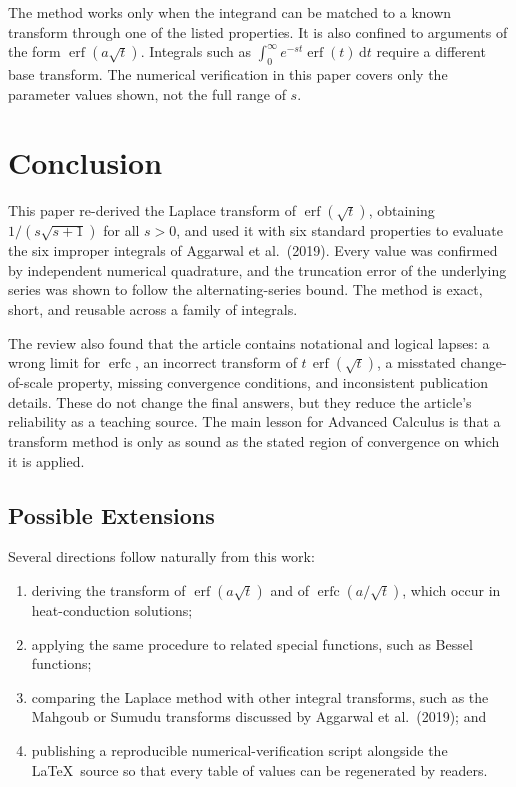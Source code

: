 \documentclass[12pt,a4paper]{article}
\theoremstyle{definition}
\theoremstyle{plain}
\theoremstyle{remark}
\newcommand{\erf}{\operatorname{erf}}
\newcommand{\erfc}{\operatorname{erfc}}
\newcommand{\dd}{\,\mathrm{d}}
\begin{document}
	The method works only when the integrand can be matched to a known transform through one of the listed properties. It is also confined to arguments of the form $\erf(a\sqrt{t})$. Integrals such as $\int_0^\infty e^{-st}\erf(t)\dd t$ require a different base transform. The numerical verification in this paper covers only the parameter values shown, not the full range of $s$.
	
	\section{Conclusion}
	
	This paper re-derived the Laplace transform of $\erf(\sqrt{t})$, obtaining $1/(s\sqrt{s+1})$ for all $s>0$, and used it with six standard properties to evaluate the six improper integrals of Aggarwal et al.\ (2019). Every value was confirmed by independent numerical quadrature, and the truncation error of the underlying series was shown to follow the alternating-series bound. The method is exact, short, and reusable across a family of integrals.
	
	The review also found that the article contains notational and logical lapses: a wrong limit for $\erfc$, an incorrect transform of $t\,\erf(\sqrt{t})$, a misstated change-of-scale property, missing convergence conditions, and inconsistent publication details. These do not change the final answers, but they reduce the article's reliability as a teaching source. The main lesson for Advanced Calculus is that a transform method is only as sound as the stated region of convergence on which it is applied.
	
	\subsection{Possible Extensions}
	
	Several directions follow naturally from this work:
	\begin{enumerate}[label=\arabic*.]
		\item deriving the transform of $\erf(a\sqrt{t})$ and of $\erfc(a/\sqrt{t})$, which occur in heat-conduction solutions;
		\item applying the same procedure to related special functions, such as Bessel functions;
		\item comparing the Laplace method with other integral transforms, such as the Mahgoub or Sumudu transforms discussed by Aggarwal et al.\ (2019); and
		\item publishing a reproducible numerical-verification script alongside the \LaTeX\ source so that every table of values can be regenerated by readers.
	\end{enumerate}
	
\end{document}
